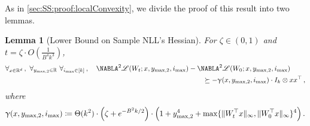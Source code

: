 \documentclass[11pt,letterpaper]{article}
\theoremstyle{plain}
\newtheorem{lemma}[theorem]{Lemma}
\theoremstyle{definition}
\theoremstyle{remark}
\newcommand{\sinbrace}[1]{\ensuremath{\{#1\}}}
\newcommand{\inparen}[1]{\ensuremath{\left(#1\right)}}
\newcommand{\R}{\mathbb{R}}
\newcommand*{\Nabla}{\boldsymbol\NABLA}
\let\nabla\Nabla
\newcommand{\customcal}[1]{\euscr{#1}}
\newcommand{\cL}{\customcal{L}}
\renewcommand{\gamma}{\upgamma}
\newcommand{\negLL}{\ensuremath{\mathscr{L}}}
\renewcommand{\cL}{\negLL}
\newcommand{\smax}{\max,2} %
\newcommand{\imax}{i_{\max}}
\newcommand{\ysmax}{y_{\smax}}
\begin{document}
{{    As in \cref{sec:SS:proof:localConvexity}, we divide the proof of this result into two lemmas.
    \begin{lemma}[Lower Bound on Sample NLL's Hessian]\label{lem:2ndPrice:LC:step1}
        For $\zeta\in(0,1)$ and $t=\zeta\cdot O\inparen{\frac{1}{B^4k^3}}$, 
        \begin{align*}
            \forall_{x\in \R^d}\,,~\forall_{\ysmax\in \R}~\forall_{\imax\in [k]}\,,\quad 
            \nabla^2 \cL(W_t;x,\ysmax,\imax) 
            &- \nabla^2 \cL(W_0;x,\ysmax,\imax)\\
            &\qquad\succeq -\gamma(x,\ysmax,\imax) \cdot I_{k}\otimes xx^\top\,,
        \end{align*}
        where
        \[ 
            \gamma(x,\ysmax,\imax) \coloneqq 
                \Theta(k^2)
                \cdot
                \Bigl(\zeta + e^{-B^2 k/2}\Bigr)\cdot
                \Bigl(1 + \ysmax^4 + \max\sinbrace{\|W_t^\top x\|_\infty, \|W_0^\top x\|_\infty}^4\Bigr)
                \,.
        \]
    \end{lemma} 
    
}}
\end{document}
